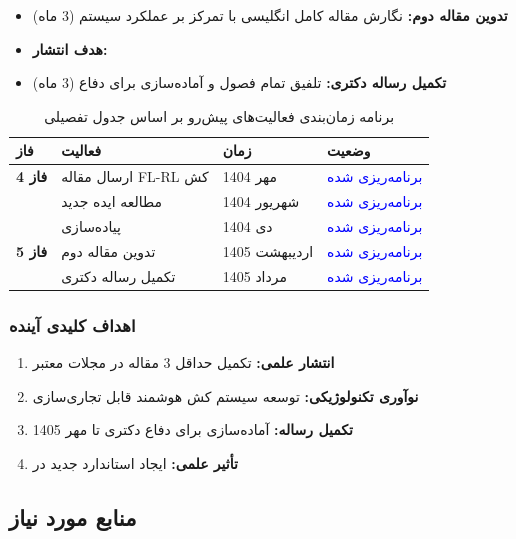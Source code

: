 \documentclass[11pt]{article}
\begin{document}
\begin{itemize}
\item \textbf{تدوین مقاله دوم:} نگارش مقاله کامل انگلیسی با تمرکز بر عملکرد سیستم (3 ماه)
\item \textbf{هدف انتشار:} 
\item \textbf{تکمیل رساله دکتری:} تلفیق تمام فصول و آماده‌سازی برای دفاع (3 ماه)
\end{itemize}

\begin{table}[h]
\centering
\caption{برنامه زمان‌بندی فعالیت‌های پیش‌رو بر اساس جدول تفصیلی}
\label{tab:timeline_updated}
\begin{tabular}{|p{2.5cm}|p{4cm}|p{2.5cm}|p{3cm}|}
\hline
\textbf{فاز} & \textbf{فعالیت} & \textbf{زمان} & \textbf{وضعیت} \\
\hline
\textbf{فاز 4} & ارسال مقاله FL-RL کش & مهر 1404 & \textcolor{blue}{برنامه‌ریزی شده} \\
\hline
& مطالعه ایده جدید & شهریور 1404 & \textcolor{blue}{برنامه‌ریزی شده} \\
\hline
& پیاده‌سازی & دی 1404 & \textcolor{blue}{برنامه‌ریزی شده} \\
\hline
\textbf{فاز 5} & تدوین مقاله دوم & اردیبهشت 1405 & \textcolor{blue}{برنامه‌ریزی شده} \\
\hline
& تکمیل رساله دکتری & مرداد 1405 & \textcolor{blue}{برنامه‌ریزی شده} \\
\hline
\end{tabular}
\end{table}

\subsubsection{اهداف کلیدی آینده}

\begin{enumerate}
\item \textbf{انتشار علمی:} تکمیل حداقل 3 مقاله در مجلات معتبر 
\item \textbf{نوآوری تکنولوژیکی:} توسعه سیستم کش هوشمند قابل تجاری‌سازی  
\item \textbf{تکمیل رساله:} آماده‌سازی برای دفاع دکتری تا مهر 1405
\item \textbf{تأثیر علمی:} ایجاد استاندارد جدید در 
\end{enumerate}

\subsection{منابع مورد نیاز}
\end{document}
